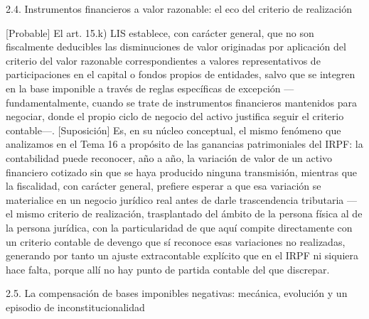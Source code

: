 \documentclass[10pt,a4paper]{article}
\begin{document}
2.4. Instrumentos financieros a valor razonable: el eco del criterio de realización

[Probable] El art. 15.k) LIS establece, con carácter general, que no son fiscalmente deducibles las disminuciones de valor originadas por aplicación del criterio del valor razonable correspondientes a valores representativos de participaciones en el capital o fondos propios de entidades, salvo que se integren en la base imponible a través de reglas específicas de excepción —fundamentalmente, cuando se trate de instrumentos financieros mantenidos para negociar, donde el propio ciclo de negocio del activo justifica seguir el criterio contable—. [Suposición] Es, en su núcleo conceptual, el mismo fenómeno que analizamos en el Tema 16 a propósito de las ganancias patrimoniales del IRPF: la contabilidad puede reconocer, año a año, la variación de valor de un activo financiero cotizado sin que se haya producido ninguna transmisión, mientras que la fiscalidad, con carácter general, prefiere esperar a que esa variación se materialice en un negocio jurídico real antes de darle trascendencia tributaria —el mismo criterio de realización, trasplantado del ámbito de la persona física al de la persona jurídica, con la particularidad de que aquí compite directamente con un criterio contable de devengo que sí reconoce esas variaciones no realizadas, generando por tanto un ajuste extracontable explícito que en el IRPF ni siquiera hace falta, porque allí no hay punto de partida contable del que discrepar.

2.5. La compensación de bases imponibles negativas: mecánica, evolución y un episodio de inconstitucionalidad
\end{document}
